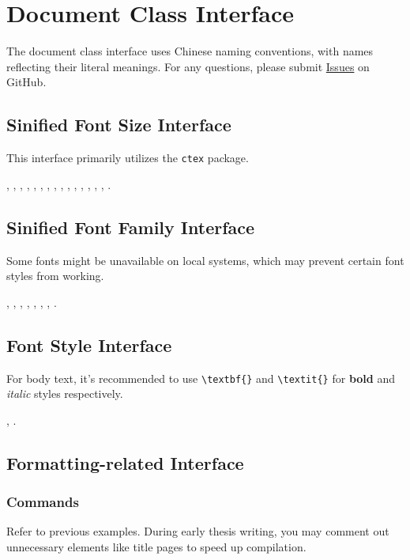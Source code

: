 \section{Document Class Interface}
The document class interface uses Chinese naming conventions, with names reflecting their literal meanings. For any questions, please submit \href{https://github.com/Iydon/sustechthesis/issues}{Issues} on GitHub.

\subsection{Sinified Font Size Interface}
This interface primarily utilizes the \texttt{ctex} package.

, , , , , , , , , , , , , , , .

\subsection{Sinified Font Family Interface}
Some fonts might be unavailable on local systems, which may prevent certain font styles from working.

, , , , , , , .

\subsection{Font Style Interface}

For body text, it's recommended to use \verb|\textbf{}| and \verb|\textit{}| for \textbf{bold} and \textit{italic} styles respectively.

, .

\subsection{Formatting-related Interface}
\subsubsection{Commands}
Refer to previous examples. During early thesis writing, you may comment out unnecessary elements like title pages to speed up compilation.

